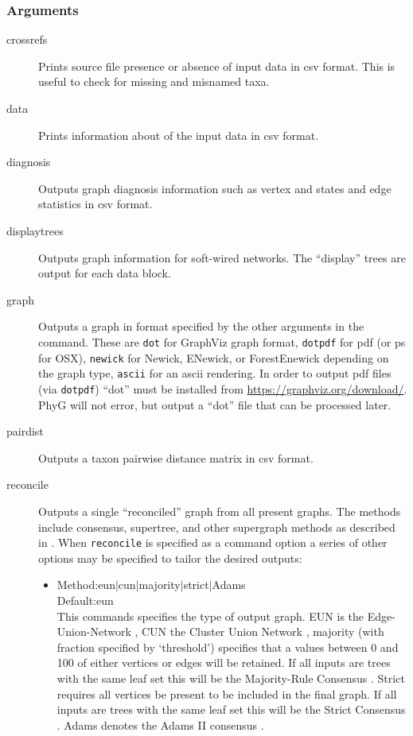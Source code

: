 	\subsubsection{Arguments}
	\begin{description}
		\item[crossrefs] Prints source file presence or absence of input data in csv format. This is 
		useful to check for missing and misnamed taxa.
			
		\item[data] Prints information about of the input data in csv format.
			
		\item[diagnosis] Outputs graph diagnosis information such as vertex and states and edge 
		statistics in csv format. 
		
		\item[displaytrees] Outputs graph information for soft-wired networks. The ``display'' trees 
		are output for each data block. 
		
		\item[graph] Outputs a graph in format specified by the other arguments in the command. 
		These are \texttt{dot} for 
		GraphViz graph format, \texttt{dotpdf} for pdf (or ps for OSX), \texttt{newick} for Newick, 
		ENewick, or ForestEnewick depending on the graph type, \texttt{ascii} for an ascii rendering. 
		In order to output pdf files (via \texttt{dotpdf}) ``dot'' must be installed from 
		\url{https://graphviz.org/download/}. PhyG will not error, but output a ``dot'' file that 
		can be processed later.
		
		\item[pairdist] Outputs a taxon pairwise distance matrix in csv format. 
		
		\item[reconcile] Outputs a single ``reconciled'' graph from all present graphs. The 
		methods include consensus, supertree, and other supergraph methods as described in 
		\cite{Wheeler2012, Wheeler2021a}. When \texttt{reconcile} is specified as a command 
		option a series of other options may be specified to tailor the desired outputs:
					
			\begin{itemize}
			\item {Method:eun$\mid$cun$\mid$majority$\mid$strict$\mid$Adams\\Default:eun\\
			This commands specifies the type of output graph. EUN is the Edge-Union-Network 
			\citep{MiyagiandWheeler2019}, CUN the Cluster Union Network \citep{Baroni2005},
			majority (with fraction specified by `threshold') specifies that a values between 0 and 
			100 of either vertices or edges will be retained. If all inputs are trees with the same leaf 
			set this will be the Majority-Rule Consensus \citep{MargushandMcMorris1981}.
			Strict requires all vertices be present to be included in the final graph. If all inputs are 
			trees with the same leaf set this will be the Strict Consensus \citep{Schuhandpolhemus1980}. 
			Adams denotes the Adams II consensus \citep{Adams1972}.}
							

\end{itemize}
\end{description}
